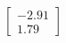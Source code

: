 \documentclass[preview]{standalone}
\begin{document}
\begin{align*}
\begin{bmatrix} -2.91 \\ 1.79 \end{bmatrix}
\end{align*}
\end{document}
